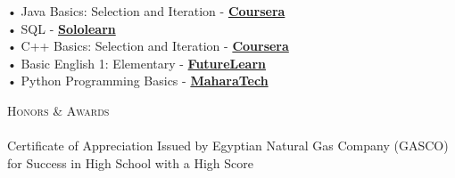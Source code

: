 \documentclass[a4paper]{article}
\newcommand{\lineunder} {
    \vspace*{-8pt} \\
    \hspace*{-18pt} \hrulefill \\
}
\newcommand{\header} [1] {
    {\hspace*{-18pt}\vspace*{6pt} \textsc{#1}}
    \vspace*{-6pt} \lineunder
}
\begin{document}
\vspace*{1mm}
      • Java Basics: Selection and Iteration - \textbf{\href{https://coursera.org/verify/JTM9KQJRRVPX}{Coursera}}\\
\vspace*{1mm}
      • SQL - \textbf{\href{https://www.sololearn.com/certificates/CT-D0OEQKTQ}{Sololearn}}\\
\vspace*{1mm}
      • C++ Basics: Selection and Iteration - \textbf{\href{https://coursera.org/verify/XBZVNYQD2ULL}{Coursera}}\\
\vspace*{1mm}
      • Basic English 1: Elementary - \textbf{\href{https://www.futurelearn.com/certificates/6b0dwsc}{FutureLearn}}\\
\vspace*{1mm}
      • Python Programming Basics - \textbf{\href{https://maharatech.gov.eg/badges/badge.php?hash=cdd36d5d43a2643e0b4b1ef117580488dc81fee7}{MaharaTech}}\\
\vspace*{1mm}
      \vspace{2mm}

\header{Honors \& Awards}
      \vspace{2mm} 
      Certificate of Appreciation Issued by Egyptian Natural Gas Company (GASCO) for Success in High School with a High Score\\
\vspace*{1mm}

    \ 
    
\end{document}
